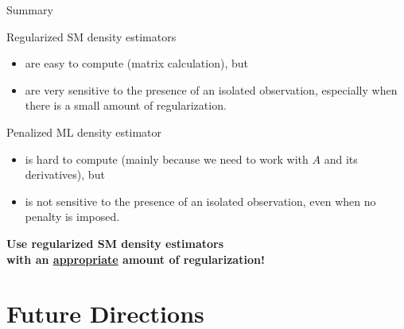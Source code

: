 \documentclass[aspectratio=169,xcolor=dvipsnames]{beamer}
\begin{document}
\begin{frame}{Summary}
	
	Regularized SM density estimators 
	\begin{itemize}
		\item are easy to compute (matrix calculation), but 
		\item are very sensitive to the presence of an isolated observation, especially when there is a small amount of regularization. 
	\end{itemize}
	
	\vspace{10pt}
	
	Penalized ML density estimator 
	\begin{itemize}
		\item is hard to compute (mainly because we need to work with $A$ and its derivatives), but 
		\item is {\color{red} not} sensitive to the presence of an isolated observation, even when no penalty is imposed. 
	\end{itemize}
	
	\vspace{10pt}
	
	\begin{center}
		\textbf{\large {\color{defaultcolor} Use regularized SM density estimators \\ with an \underline{appropriate} amount of regularization!}}
	\end{center}
		
\end{frame}


\section{Future Directions}

%	
%	
\end{document}

